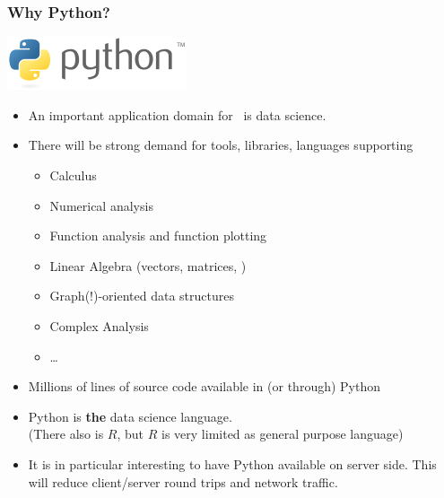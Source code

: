 \documentclass{beamer}
\begin{document}
\begin{frame}[shrink]
\frametitle{Why Python?}
\includegraphics[width=0.2\linewidth]{pythonlogo.png}
\begin{itemize}
\item An important application domain for \nowdb\ is data science.
\item There will be strong demand for tools, libraries, languages supporting
\begin{itemize}
\item Calculus
\item Numerical analysis
\item Function analysis and function plotting
\item Linear Algebra (vectors, matrices, \etc)
\item Graph(!)-oriented data structures
\item Complex Analysis
\item \dots
\end{itemize}
\item Millions of lines of source code available in (or through) Python
\item Python is \textbf{the} data science language.\\
      (There also is $R$, but $R$ is very limited as general purpose language)
\item It is in particular interesting to have Python available
      on server side.
      This will reduce client/server round trips
      and network traffic.
\end{itemize}
\end{frame}
\end{document}
